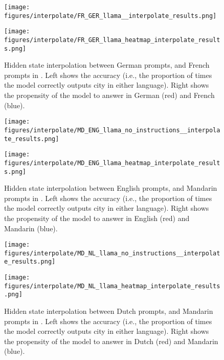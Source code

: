\begin{figure}[h]
\begin{minipage}{0.49\textwidth}
    \centering
    \texttt{[image: figures/interpolate/FR\_GER\_llama\_\_interpolate\_results.png]} 
\end{minipage}
\begin{minipage}{0.49\textwidth}
    \centering
    \texttt{[image: figures/interpolate/FR\_GER\_llama\_heatmap\_interpolate\_results.png]} 
\end{minipage}
\caption{Hidden state interpolation between German prompts, and French prompts in \llama. Left shows the accuracy (i.e., the proportion of times the model correctly outputs city in either language). Right shows the propensity of the model to answer in German (red) and French (blue). }
\end{figure}


\begin{figure}[h]
\begin{minipage}{0.49\textwidth}
    \centering
    \texttt{[image: figures/interpolate/MD\_ENG\_llama\_no\_instructions\_\_interpolate\_results.png]}
\end{minipage}
\begin{minipage}{0.49\textwidth}
    \centering
    \texttt{[image: figures/interpolate/MD\_ENG\_llama\_heatmap\_interpolate\_results.png]} 
\end{minipage}
\caption{Hidden state interpolation between English prompts, and Mandarin prompts in \llama. Left shows the accuracy (i.e., the proportion of times the model correctly outputs city in either language). Right shows the propensity of the model to answer in English (red) and Mandarin (blue). }
\end{figure}


\begin{figure}[h]
\begin{minipage}{0.49\textwidth}
    \centering
    \texttt{[image: figures/interpolate/MD\_NL\_llama\_no\_instructions\_\_interpolate\_results.png]} 
\end{minipage}
\begin{minipage}{0.49\textwidth}
    \centering
    \texttt{[image: figures/interpolate/MD\_NL\_llama\_heatmap\_interpolate\_results.png]} 
\end{minipage}
\caption{Hidden state interpolation between Dutch prompts, and Mandarin prompts in \llama. Left shows the accuracy (i.e., the proportion of times the model correctly outputs city in either language). Right shows the propensity of the model to answer in Dutch (red) and Mandarin (blue). }
\end{figure}


